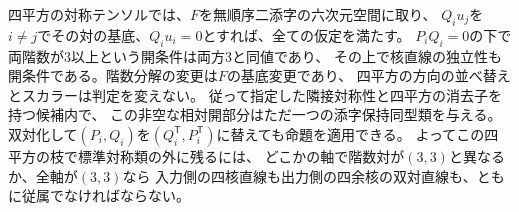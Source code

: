 四平方の対称テンソルでは、$F$を無順序二添字の六次元空間に取り、
$Q_i u_j$を$i\ne j$でその対の基底、$Q_i u_i=0$とすれば、全ての仮定を満たす。
$P_iQ_i=0$の下で両階数が3以上という開条件は両方3と同値であり、
その上で核直線の独立性も開条件である。階数分解の変更は$F$の基底変更であり、
四平方の方向の並べ替えとスカラーは判定を変えない。
従って指定した隣接対称性と四平方の消去子を持つ候補内で、
この非空な相対開部分はただ一つの添字保持同型類を与える。
双対化して$(P_i,Q_i)$を$(Q_i^{\mathsf T},P_i^{\mathsf T})$に替えても命題を適用できる。
よってこの四平方の枝で標準対称類の外に残るには、
どこかの軸で階数対が$(3,3)$と異なるか、全軸が$(3,3)$なら
入力側の四核直線も出力側の四余核の双対直線も、ともに従属でなければならない。
